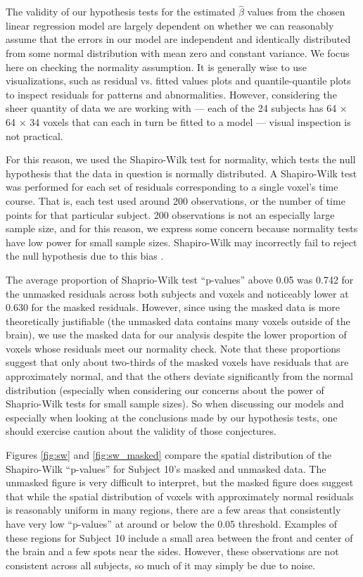 \par \indent The validity of our hypothesis tests for the estimated 
$\hat{\beta}$ values from the chosen linear regression model are largely 
dependent on whether we can reasonably assume that the errors in our model 
are independent and identically distributed from some normal distribution 
with mean zero and constant variance. We focus here on checking the normality 
assumption. It is generally wise to use visualizations, such as residual vs. 
fitted values plots and quantile-quantile plots to inspect residuals for 
patterns and abnormalities. However, considering the sheer quantity of data 
we are working with --- each of the 24 subjects has 64 $\times$ 64 $\times$ 34 
voxels that can each in turn be fitted to a model --- visual inspection is 
not practical. 

For this reason, we used the Shapiro-Wilk test for normality, 
which tests the null hypothesis that the data in question is normally 
distributed. A Shapiro-Wilk test was performed for each set of residuals 
corresponding to a single voxel's time course. That is, each test used around 
200 observations, or the number of time points for that particular subject. 
200 observations is not an especially large sample size, and for this reason, 
we express some concern because normality tests have low power for small 
sample sizes. Shapiro-Wilk may incorrectly fail to reject the null hypothesis 
due to this bias \cite{ghasemi2012normality}. 

The average proportion of Shaprio-Wilk test ``p-values'' above 0.05 was 0.742 
for the unmasked residuals across both subjects and voxels and noticeably 
lower at 0.630 for the masked residuals. However, since using the masked data 
is more theoretically justifiable (the unmasked data contains many voxels 
outside of the brain), we use the masked data for our analysis despite the 
lower proportion of voxels whose residuals meet our normality check. Note that 
these proportions suggest that only about two-thirds of the masked voxels have 
residuals that are approximately normal, and that the others deviate 
significantly from the normal distribution (especially when considering our 
concerns about the power of Shaprio-Wilk tests for small sample sizes). So when 
discussing our models and especially when looking at the conclusions made by 
our hypothesis tests, one should exercise caution about the validity of those 
conjectures. 

Figures \ref{fig:sw} and \ref{fig:sw_masked} compare the spatial distribution 
of the Shapiro-Wilk ``p-values'' for Subject 10's masked and unmasked data. 
The unmasked figure is very difficult to interpret, but the masked figure does 
suggest that while the spatial distribution of voxels with approximately 
normal residuals is reasonably uniform in many regions, there are a few areas 
that consistently have very low ``p-values'' at around or below the 0.05 
threshold. Examples of these regions for Subject 10 include a small area 
between the front and center of the brain and a few spots near the sides. 
However, these observations are not consistent across all subjects, so much 
of it may simply be due to noise. 

